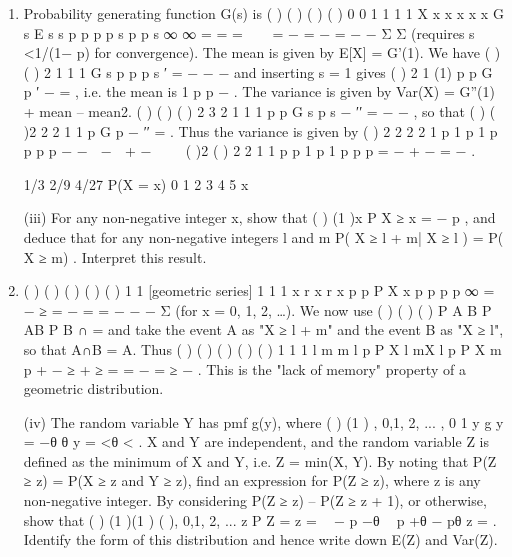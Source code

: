 \documentclass[a4paper,12pt]{article}
\begin{document}
\begin{enumerate}
    \item Probability generating function G(s) is
( ) ( ) {( ) } ( ) 0 0
1 1
1 1
X x x x
x x
G s E s s p p p p s p
p s
∞ ∞
= =
=   = − = − = − − Σ Σ
(requires s <1/(1− p) for convergence).
The mean is given by E[X] = G'(1). We have ( )
{ ( ) }2
1
1 1
G s p p
p s
′ = −
− −
and inserting
s = 1 gives ( )
2
1
(1)
p p
G
p
′ − = , i.e. the mean is 1 p
p
− .
The variance is given by Var(X) = G''(1) + mean – mean2. ( ) ( )
{ ( ) }
2
3
2 1
1 1
p p
G s
p s
−
′′ =
− −
, so
that ( ) ( )2
2
2 1
1
p
G
p
−
′′ = . Thus the variance is given by ( ) 2 2
2
2 1 p 1 p 1 p
p p p
− −  −  + − 
 
{( )2 ( )}
2 2
1 1 p p 1 p 1 p
p p
= − + − = − .

1/3
2/9
4/27
P(X = x)
0 1 2 3 4 5
x
\begin{framed}
(iii) For any non-negative integer x, show that ( ) (1 )x P X ≥ x = − p , and deduce
that for any non-negative integers l and m
P( X ≥ l + m| X ≥ l ) = P( X ≥ m) .
Interpret this result.
\end{framed}

\item  ( ) ( ) ( )
( ) ( ) 1
1 [geometric series] 1
1 1
x
r x
r x
p p
P X x p p p
p
∞
=
−
≥ = − = = −
− − Σ (for x =
0, 1, 2, …). We now use ( ) ( )
( )
P A B
P AB
P B
∩
= and take the event A as "X ≥ l + m"
and the event B as "X ≥ l", so that A∩B = A. Thus
( ) ( )
( )
( ) ( ) 1
1
1
l m
m
l
p
P X l mX l p P X m
p
+ −
≥ + ≥ = = − = ≥
−
.
This is the "lack of memory" property of a geometric distribution.

\begin{framed}
(iv) The random variable Y has pmf g(y), where
( ) (1 ) , 0,1, 2, ... , 0 1 y g y = −θ θ y = <θ < .
X and Y are independent, and the random variable Z is defined as the minimum
of X and Y, i.e. Z = min(X, Y). By noting that P(Z ≥ z) = P(X ≥ z and Y ≥ z),
find an expression for P(Z ≥ z), where z is any non-negative integer. By
considering P(Z ≥ z) – P(Z ≥ z + 1), or otherwise, show that
( ) (1 )(1 ) ( ), 0,1, 2, ... z P Z = z =  − p −θ  p +θ − pθ z = .
Identify the form of this distribution and hence write down E(Z) and Var(Z).

\end{framed}


\end{enumerate}
\end{document}
